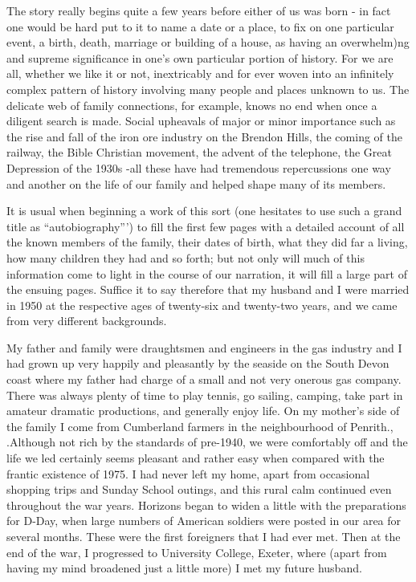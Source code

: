 
The story really begins quite a few years before either of us was born - in fact one would be hard put to it to name a date or a place, to fix on one particular event, a birth, death, marriage or building of a house, as having an overwhelm)ng and supreme significance in one's own particular portion of history. For we are all, whether we like it or not, inextricably and for ever woven into an infinitely complex pattern of history involving many people and places unknown to us. The delicate web of family connections, for example, knows no end when once a diligent search is made. Social upheavals of major or minor importance such as the rise and fall of the iron ore industry on the Brendon Hills, the coming of the railway, the Bible Christian movement, the advent of the telephone, the Great Depression of the 1930s -all these have had tremendous repercussions one way and another on the life of our family and helped shape many of its members.

It is usual when beginning a work of this sort (one hesitates to use such a grand title as “autobiography”') to fill the first few pages with a detailed account of all the known members of the family, their dates of birth, what they did far a living, how many children they had and so forth; but not only will much of this information come to light in the course of our narration, it will fill a large part of the ensuing pages. Suffice it to say therefore that my husband and I were married in 1950 at the respective ages of twenty-six and twenty-two years, and we came from very different backgrounds.

My father and family were draughtsmen and engineers in the gas industry and I had grown up very happily and pleasantly by the seaside on the South Devon coast where my father had charge of a small and not very onerous gas company. There was always plenty of time to play tennis, go sailing, camping, take part in amateur dramatic productions, and generally enjoy life. On my mother's side of the family I come from Cumberland farmers in the neighbourhood of Penrith., .Although not rich by the standards of pre-1940, we were comfortably off and the life we led certainly seems pleasant and rather easy when compared with the frantic existence of 1975. I had never left my home, apart from occasional shopping trips and Sunday School outings, and this rural calm continued even throughout the war years. Horizons began to widen a little with the preparations for D-Day, when large numbers of American soldiers were posted in our area for several months. These were the first foreigners that I had ever met.  Then at the end of the war, I progressed to University College, Exeter, where (apart from having my mind broadened just a little more) I met my future husband.

